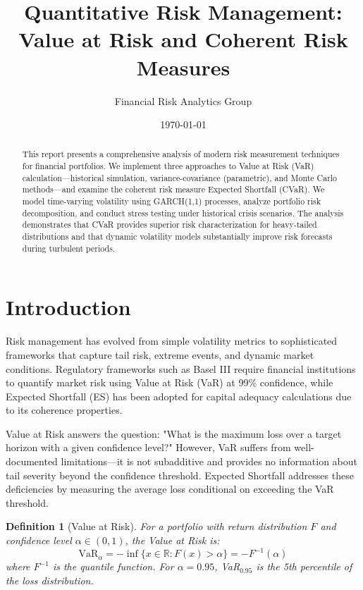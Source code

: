 \documentclass[11pt,a4paper]{article}
\title{Quantitative Risk Management:\\Value at Risk and Coherent Risk Measures}
\author{Financial Risk Analytics Group}
\date{\today}
\newtheorem{definition}{Definition}[section]
\begin{document}
\maketitle

\begin{abstract}
This report presents a comprehensive analysis of modern risk measurement techniques for financial portfolios. We implement three approaches to Value at Risk (VaR) calculation—historical simulation, variance-covariance (parametric), and Monte Carlo methods—and examine the coherent risk measure Expected Shortfall (CVaR). We model time-varying volatility using GARCH(1,1) processes, analyze portfolio risk decomposition, and conduct stress testing under historical crisis scenarios. The analysis demonstrates that CVaR provides superior risk characterization for heavy-tailed distributions and that dynamic volatility models substantially improve risk forecasts during turbulent periods.
\end{abstract}

\section{Introduction}

Risk management has evolved from simple volatility metrics to sophisticated frameworks that capture tail risk, extreme events, and dynamic market conditions. Regulatory frameworks such as Basel III require financial institutions to quantify market risk using Value at Risk (VaR) at 99\% confidence, while Expected Shortfall (ES) has been adopted for capital adequacy calculations due to its coherence properties.

Value at Risk answers the question: "What is the maximum loss over a target horizon with a given confidence level?" However, VaR suffers from well-documented limitations—it is not subadditive and provides no information about tail severity beyond the confidence threshold. Expected Shortfall addresses these deficiencies by measuring the average loss conditional on exceeding the VaR threshold.

\begin{definition}[Value at Risk]
For a portfolio with return distribution $F$ and confidence level $\alpha \in (0,1)$, the Value at Risk is:
\begin{equation}
\text{VaR}_\alpha = -\inf\{x \in \mathbb{R} : F(x) > \alpha\} = -F^{-1}(\alpha)
\end{equation}
where $F^{-1}$ is the quantile function. For $\alpha = 0.95$, VaR$_{0.95}$ is the 5th percentile of the loss distribution.
\end{definition}
\end{document}
